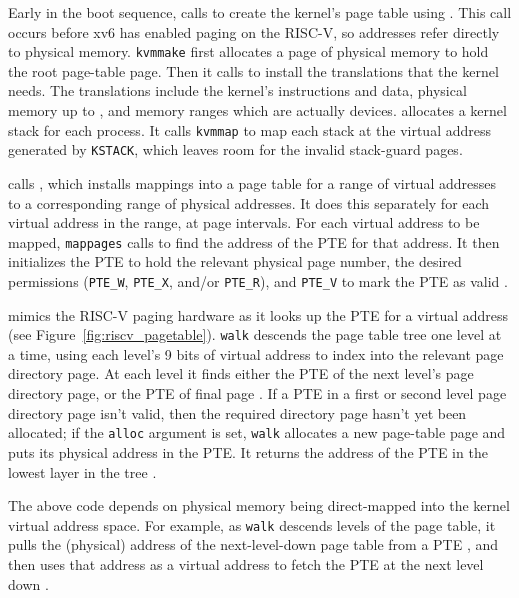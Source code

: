 Early in the boot sequence,
calls
to create the kernel's page table using
.
This call occurs before xv6 has enabled paging on the RISC-V,
so addresses refer directly to physical memory.
\lstinline{kvmmake}
first allocates a page of physical memory to hold the root page-table page.
Then it calls
to install the translations that the kernel needs.
The translations include the kernel's
instructions and data, physical memory up to
,
and memory ranges which are actually devices.
allocates a kernel stack for each
process. It calls \lstinline{kvmmap} to map each stack at the virtual address generated by
\lstinline{KSTACK}, which leaves room for the invalid stack-guard
pages.

calls
,
which
installs mappings into a page table
for a range of virtual addresses to
a corresponding range of physical addresses.
It does this separately for each virtual address in the range,
at page intervals.
For each virtual address to be mapped,
\lstinline{mappages}
calls
to find the address of the PTE for that address.
It then initializes the PTE to hold the relevant physical page
number, the desired permissions 
(\lstinline{PTE_W},
\lstinline{PTE_X},
and/or
\lstinline{PTE_R}),
and
\lstinline{PTE_V}
to mark the PTE as valid
.

mimics the RISC-V paging hardware as it
looks up the PTE for a virtual address (see
Figure~\ref{fig:riscv_pagetable}).
\lstinline{walk}
descends the page table tree one level at a time,
using each level's 9 bits of virtual address to
index into the relevant page directory page.
At each level it finds either the PTE of the
next level's page directory page, or the PTE of
final page
.
If a PTE in a first or second level page directory
page isn't valid, then the required directory page
hasn't yet been allocated;
if the
\lstinline{alloc}
argument is set,
\lstinline{walk}
allocates a new page-table page and puts its physical address in the PTE.
It returns the address of the PTE in the lowest layer in the tree
.

The above code depends on physical memory being direct-mapped into the
kernel virtual address space. For example, as \lstinline{walk} descends levels
of the page table, it pulls the (physical) address of the
next-level-down page table from a PTE ,
and then uses that address as a
virtual address to fetch the PTE at the next level down
.

